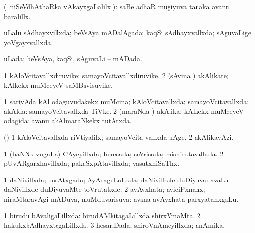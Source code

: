 {{\bentry
{} 
\gl{\saMavayx}
\expl{}
\bmng
{} (\sA\ niSeVdhAthaRka vAkayxgaLalilx \parx):  saBe adhaR mugiyuva tanaka avanu baralillx. 
\emng
\eentry

\bentry
{} 
\gl{\gu}
\expl{}
\bmng
uLalu sAdhayxvillxda; beVsAya mADalAgada; kaqSi sAdhayxvallxda; sAguvaLige yoVgayxvallxda. 
\emng
\eentry

\bentry
{} 
\gl{\gu}
\expl{}
\bmng
uLada; beVsAya, kaqSi, sAguvaLi -- mADada. 
\emng
\eentry

\bentry
{} 
\gl{\nA}
\expl{}
\bmng
\bnum
\num{1} kAloVcitavallxdiruvike; samayoVcitavallxdiruvike. 
\num{2} (sAvina \vi) akAlikate; kAlkekx muMceyeV saMBavisuvike. 
\enum
\emng
\eentry

\bentry
{} 
\gl{\gu}
\expl{}
\bmng
\bnum
\num{1} sariyAda kAl odaguvudakekx muMcina; kAloVcitavallxda; samayoVcitavallxda; akAlda:  samayoVcitavallxda TiVke. 
\num{2} (maraNda \vi) akAlika; kAlkekx muMceyeV odagida:  avanu akAlmaraNkekx tutAtxda. 
\enum
\emng
\eentry

\bentry
{} 
\gl{\kirxvi}
\expl{}
\bmng
(\pArxparx) 
\bnum
\num{1} kAloVcitavallxda riVtiyalilx; samayoVcita vallxda hAge. 
\num{2} akAlikavAgi. 
\enum
\emng
\eentry

\bentry
{} 
\gl{\gu}
\expl{}
\bmng
\bnum
\num{1} (baNNx \mo vugaLa) CAyeyillxda; beresada; seVrisada; mishirxtavallxda. 
\num{2} pUvARgarxhavillxda; pakaSxpAtavillxda; vasutxniSaThx. 
\enum
\emng
\eentry

\bentry
{} 
\gl{\gu}
\expl{}
\bmng
\bnum
\num{1} daNivillxda; susAtxgada; AyAsagoLaLxda; daNivillxde duDiyuva:  avaLu daNivillxde duDiyuvaMte toVrutatxde. 
\num{2} avAyxhata; aviciPxnanx; niraMtaravAgi mADuva, muMduvarisuva:  avana avAyxhata parxyatanxgaLu. 
\enum
\emng
\eentry

\bentry
{} 
\gl{\gu}
\expl{}
\bmng
\bnum
\num{1} birudu bAvaligaLillxda:  birudAMkitagaLillxda shirxVmaMta. 
\num{2} hakukxbAdhayxtegaLillxda. 
\num{3} hesariDada; shiroVnAmeyillxda; anAmika. 
\enum
\emng
\eentry

}}

